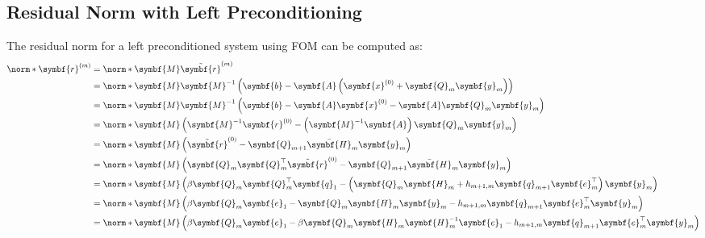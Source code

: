 \documentclass{article}
\begin{document}
\begin{appendix}
    \subsection{Residual Norm with Left Preconditioning}\label{app:res-left-precond}
    The residual norm for a left preconditioned system using FOM can be
    computed as:
    \begin{align*}
        \norm*{\symbf{r}^{\left( m \right)}} & = \norm*{\symbf{M} \tilde{\symbf{r}}^{\left( m \right)}}                                                                                                                               \\
                                             & = \norm*{\symbf{M} \symbf{M}^{-1} \left( \symbf{b} - \symbf{A} \left( \symbf{x}^{\left( 0 \right)} + \symbf{Q}_m \symbf{y}_m \right) \right)}                                          \\
                                             & = \norm*{\symbf{M} \symbf{M}^{-1} \left( \symbf{b} - \symbf{A} \symbf{x}^{\left( 0 \right)} - \symbf{A} \symbf{Q}_m \symbf{y}_m \right)}                                               \\
                                             & = \norm*{\symbf{M} \left( \symbf{M}^{-1} \symbf{r}^{\left( 0 \right)} - \left( \symbf{M}^{-1} \symbf{A} \right) \symbf{Q}_m \symbf{y}_m \right)}                                       \\
                                             & = \norm*{\symbf{M} \left( \tilde{\symbf{r}}^{\left( 0 \right)} - \symbf{Q}_{m+1} \bar{\symbf{H}}_m \symbf{y}_m \right)}                                                                \\
                                             & = \norm*{\symbf{M} \left( \symbf{Q}_m \symbf{Q}_m^\top \tilde{\symbf{r}}^{\left( 0 \right)} - \symbf{Q}_{m+1} \bar{\symbf{H}}_m \symbf{y}_m \right)}                                   \\
                                             & = \norm*{\symbf{M} \left( \beta \symbf{Q}_m \symbf{Q}_m^\top \symbf{q}_1 - \left( \symbf{Q}_m \symbf{H}_m + h_{m+1,m} \symbf{q}_{m+1} \symbf{e}_m^\top \right) \symbf{y}_m \right)}    \\
                                             & = \norm*{\symbf{M} \left( \beta \symbf{Q}_m \symbf{e}_1 - \symbf{Q}_m \symbf{H}_m \symbf{y}_m - h_{m+1,m} \symbf{q}_{m+1} \symbf{e}_m^\top \symbf{y}_m \right)}                        \\
                                             & = \norm*{\symbf{M} \left( \beta \symbf{Q}_m \symbf{e}_1 - \beta \symbf{Q}_m \symbf{H}_m \symbf{H}_m^{-1} \symbf{e}_1 - h_{m+1,m} \symbf{q}_{m+1} \symbf{e}_m^\top \symbf{y}_m \right)} \\

\end{align*}
\end{appendix}
\end{document}
